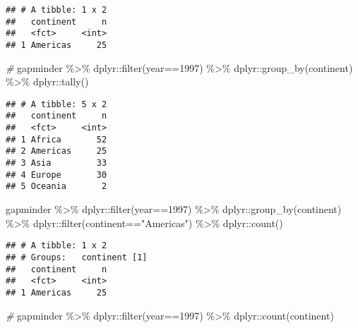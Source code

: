 \documentclass[
]{book}
\newenvironment{Shaded}{\begin{snugshade}}{\end{snugshade}}
\newcommand{\CommentTok}[1]{\textcolor[rgb]{0.56,0.35,0.01}{\textit{#1}}}
\newcommand{\DecValTok}[1]{\textcolor[rgb]{0.00,0.00,0.81}{#1}}
\newcommand{\FunctionTok}[1]{\textcolor[rgb]{0.00,0.00,0.00}{#1}}
\newcommand{\NormalTok}[1]{#1}
\newcommand{\SpecialCharTok}[1]{\textcolor[rgb]{0.00,0.00,0.00}{#1}}
\newcommand{\StringTok}[1]{\textcolor[rgb]{0.31,0.60,0.02}{#1}}
\begin{document}
\begin{verbatim}
## # A tibble: 1 x 2
##   continent     n
##   <fct>     <int>
## 1 Americas     25
\end{verbatim}

\begin{Shaded}
\begin{Highlighting}[]
\CommentTok{\#}
\NormalTok{gapminder }\SpecialCharTok{\%\textgreater{}\%}\NormalTok{ dplyr}\SpecialCharTok{::}\FunctionTok{filter}\NormalTok{(year}\SpecialCharTok{==}\DecValTok{1997}\NormalTok{) }\SpecialCharTok{\%\textgreater{}\%}
\NormalTok{  dplyr}\SpecialCharTok{::}\FunctionTok{group\_by}\NormalTok{(continent) }\SpecialCharTok{\%\textgreater{}\%}
\NormalTok{  dplyr}\SpecialCharTok{::}\FunctionTok{tally}\NormalTok{()}
\end{Highlighting}
\end{Shaded}

\begin{verbatim}
## # A tibble: 5 x 2
##   continent     n
##   <fct>     <int>
## 1 Africa       52
## 2 Americas     25
## 3 Asia         33
## 4 Europe       30
## 5 Oceania       2
\end{verbatim}

\begin{Shaded}
\begin{Highlighting}[]
\NormalTok{gapminder }\SpecialCharTok{\%\textgreater{}\%}\NormalTok{ dplyr}\SpecialCharTok{::}\FunctionTok{filter}\NormalTok{(year}\SpecialCharTok{==}\DecValTok{1997}\NormalTok{) }\SpecialCharTok{\%\textgreater{}\%}
\NormalTok{  dplyr}\SpecialCharTok{::}\FunctionTok{group\_by}\NormalTok{(continent) }\SpecialCharTok{\%\textgreater{}\%}
\NormalTok{  dplyr}\SpecialCharTok{::}\FunctionTok{filter}\NormalTok{(continent}\SpecialCharTok{==}\StringTok{"Americas"}\NormalTok{) }\SpecialCharTok{\%\textgreater{}\%}
\NormalTok{  dplyr}\SpecialCharTok{::}\FunctionTok{count}\NormalTok{()}
\end{Highlighting}
\end{Shaded}

\begin{verbatim}
## # A tibble: 1 x 2
## # Groups:   continent [1]
##   continent     n
##   <fct>     <int>
## 1 Americas     25
\end{verbatim}

\begin{Shaded}
\begin{Highlighting}[]
\CommentTok{\#}
\NormalTok{gapminder }\SpecialCharTok{\%\textgreater{}\%}\NormalTok{ dplyr}\SpecialCharTok{::}\FunctionTok{filter}\NormalTok{(year}\SpecialCharTok{==}\DecValTok{1997}\NormalTok{) }\SpecialCharTok{\%\textgreater{}\%}
\NormalTok{  dplyr}\SpecialCharTok{::}\FunctionTok{count}\NormalTok{(continent)}
\end{Highlighting}
\end{Shaded}
\end{document}
